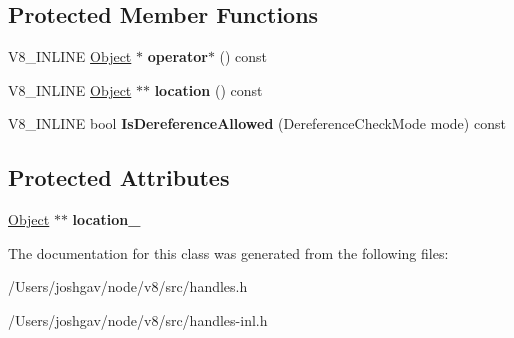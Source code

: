 \subsection*{Protected Member Functions}
\begin{DoxyCompactItemize}
\item 
V8\+\_\+\+I\+N\+L\+I\+NE \hyperlink{classv8_1_1internal_1_1_object}{Object} $\ast$ {\bfseries operator$\ast$} () const \hypertarget{classv8_1_1internal_1_1_handle_base_a1a79b6abdca3217cd503136c43308db3}{}\label{classv8_1_1internal_1_1_handle_base_a1a79b6abdca3217cd503136c43308db3}

\item 
V8\+\_\+\+I\+N\+L\+I\+NE \hyperlink{classv8_1_1internal_1_1_object}{Object} $\ast$$\ast$ {\bfseries location} () const \hypertarget{classv8_1_1internal_1_1_handle_base_aed2d9d71bb85be3d87b3de2da0ffd124}{}\label{classv8_1_1internal_1_1_handle_base_aed2d9d71bb85be3d87b3de2da0ffd124}

\item 
V8\+\_\+\+I\+N\+L\+I\+NE bool {\bfseries Is\+Dereference\+Allowed} (Dereference\+Check\+Mode mode) const \hypertarget{classv8_1_1internal_1_1_handle_base_a0717fb3fed520f1ea52080c7c0d1a2c1}{}\label{classv8_1_1internal_1_1_handle_base_a0717fb3fed520f1ea52080c7c0d1a2c1}

\end{DoxyCompactItemize}
\subsection*{Protected Attributes}
\begin{DoxyCompactItemize}
\item 
\hyperlink{classv8_1_1internal_1_1_object}{Object} $\ast$$\ast$ {\bfseries location\+\_\+}\hypertarget{classv8_1_1internal_1_1_handle_base_acdba56804a9be67647315ce61ade5603}{}\label{classv8_1_1internal_1_1_handle_base_acdba56804a9be67647315ce61ade5603}

\end{DoxyCompactItemize}


The documentation for this class was generated from the following files\+:\begin{DoxyCompactItemize}
\item 
/\+Users/joshgav/node/v8/src/handles.\+h\item 
/\+Users/joshgav/node/v8/src/handles-\/inl.\+h\end{DoxyCompactItemize}
